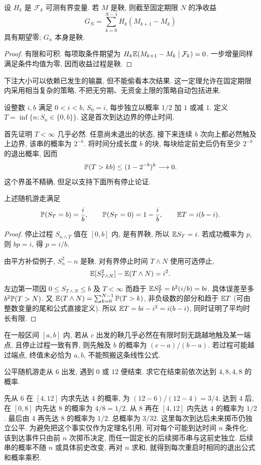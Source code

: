\begin{proposition}[可预测下注]
设 $H_k$ 是 $\mathcal F_k$ 可测有界变量. 若 $M$ 是鞅, 则截至固定期限 $N$ 的净收益
\[
 G_N=\sum_{k=0}^{N-1}H_k(M_{k+1}-M_k)
\]
具有期望零; $G_n$ 本身是鞅.
\end{proposition}
\begin{proof}
有限和可积. 每项取条件期望为
$H_k\mathbb E(M_{k+1}-M_k\mid\mathcal F_k)=0$. 一步增量同样满足条件均值为零, 因而收益过程是鞅.
\end{proof}
下注大小可以依赖已发生的输赢, 但不能偷看本次结果. 这一定理允许在固定期限内采用相当复杂的策略, 不把无穷期、无资金上限的策略自动包括进来.

设整数 $i,b$ 满足 $0<i<b$, $S_0=i$, 每步独立以概率 $1/2$ 加 $1$ 或减 $1$. 定义
$T=\inf\{n:S_n\in\{0,b\}\}$. 这是首次到达边界的停止时间.

首先证明 $T<\infty$ 几乎必然. 任意尚未退出的状态, 接下来连续 $b$ 次向上都必然触及上边界, 该串的概率为 $2^{-b}$. 将时间分成长度 $b$ 的块, 每块给定前史后仍有至少 $2^{-b}$ 的退出概率, 因而
\[
 \mathbb P(T>kb)\leq(1-2^{-b})^k\longrightarrow0.
\]
这个界虽不精确, 但足以支持下面所有停止论证.

\begin{theorem}[公平赌场破产概率与平均时长]
上述随机游走满足
\[
 \mathbb P(S_T=b)=\frac ib,\qquad \mathbb P(S_T=0)=1-\frac ib,
 \qquad \mathbb E T=i(b-i).
\]
\end{theorem}
\begin{proof}
停止过程 $S_{n\wedge T}$ 值在 $[0,b]$ 内, 是有界鞅, 所以
$\mathbb E S_T=i$. 若成功概率为 $p$, 则 $bp=i$, 得 $p=i/b$.

由平方补偿例子, $S_n^2-n$ 是鞅. 对有界停止时间 $T\wedge N$ 使用可选停止,
\[
 \mathbb E[S_{T\wedge N}^2]-\mathbb E(T\wedge N)=i^2.
\]
左边第一项因 $0\leq S_{T\wedge N}\leq b$ 及 $T<\infty$ 而趋于
$\mathbb E S_T^2=b^2(i/b)=bi$. 具体误差至多 $b^2\mathbb P(T>N)$.
又 $\mathbb E(T\wedge N)=\sum_{k=0}^{N-1}\mathbb P(T>k)$, 非负级数的部分和趋于 $\mathbb E T$ (可由整数变量的尾和公式直接定义). 所以
$\mathbb E T=bi-i^2=i(b-i)$, 同时证明了平均时长有限.
\end{proof}
在一般区间 $[a,b]$ 内, 若从 $c$ 出发的鞅几乎必然在有限时刻无跳越地触及某一端点, 且停止过程一致有界, 则先触及 $b$ 的概率为 $(c-a)/(b-a)$. 若过程可能越过端点, 终值未必恰为 $a,b$, 不能照搬这条线性公式.

\begin{example}
公平随机游走从 $6$ 出发, 遇到 $0$ 或 $12$ 便结束. 求它在结束前依次达到 $4,8,4,8$ 的概率.
\end{example}
\begin{solution}
先从 $6$ 在 $[4,12]$ 内求先达 $4$ 的概率, 为 $(12-6)/(12-4)=3/4$. 达到 $4$ 后, 在 $[0,8]$ 内先达 $8$ 的概率为 $4/8=1/2$. 从 $8$ 再在 $[4,12]$ 内先达 $4$ 的概率为 $1/2$. 最后由 $4$ 再先达 $8$ 的概率为 $1/2$. 总概率为 $3/32$.
这里每次到达后未来掷币仍独立公平. 为避免把这个事实仅作为定理名引用, 可对每个可能到达时间 $n$ 条件化: 该到达事件只由前 $n$ 次掷币决定, 而任一固定长的后续掷币串与这前史独立. 后续串的概率不随 $n$ 或具体前史改变, 再对 $n$ 求和, 就得到每次重启时相同的退出公式和概率乘积.
\end{solution}


